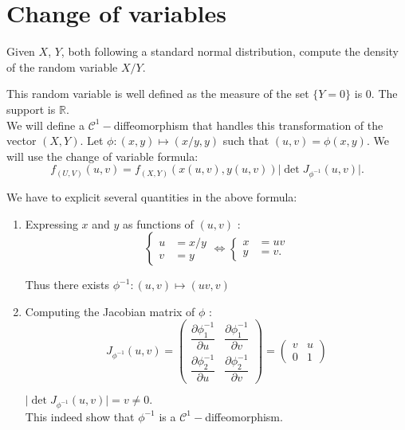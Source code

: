 \section{Change of variables}

\begin{tcolorbox}[width=\linewidth, sharp corners=all, colback=white!95!black]
Given $X$, $Y$, both following a standard normal distribution, compute the density of the random variable $X/Y$.
\end{tcolorbox}

This random variable is well defined as the measure of the set $\{Y = 0\}$ is $0$. The support is $\mathbb{R}$.\\

We will define a $\mathcal{C}^1-$diffeomorphism that handles this transformation of the vector $(X,Y)$. Let $\phi \colon (x,y) \mapsto (x/y, y)$ such that $(u,v) = \phi(x,y).$ We will use the change of variable formula: $$f_{(U,V)}(u,v) = f_{(X,Y)}(x(u,v), y(u,v)) \lvert \operatorname{det} J_{\phi^{-1}}(u,v)\lvert.$$

We have to explicit several quantities in the above formula:
\begin{enumerate}
    \item Expressing $x$ and $y$ as functions of $(u,v)$ :
    $$\left\{\begin{array}{ll}
        u &= x/y \\
        v &= y
    \end{array} \right.
    \Leftrightarrow 
    \left\{\begin{array}{ll}
        x &= uv \\
        y &= v.
    \end{array}\right.$$
    
    Thus there exists $\phi^{-1} \colon (u,v) \mapsto (uv, v)$

    \item Computing the Jacobian matrix of $\phi$ :
    $$J_{\phi^{-1}}(u,v) = \begin{pmatrix} \dfrac{\partial \phi^{-1}_1}{\partial u} & \dfrac{\partial \phi^{-1}_1}{\partial v}\\ \dfrac{\partial \phi^{-1}_2}{\partial u} & \dfrac{\partial \phi^{-1}_2}{\partial v}\end{pmatrix} = \begin{pmatrix} v & u\\ 0 & 1\end{pmatrix}$$
     
    $\lvert \operatorname{det} J_{\phi^{-1}}(u,v)\lvert = v \neq 0.$\\
    This indeed show that $\phi^{-1}$ is a $\mathcal{C}^1-$diffeomorphism.
\end{enumerate}

